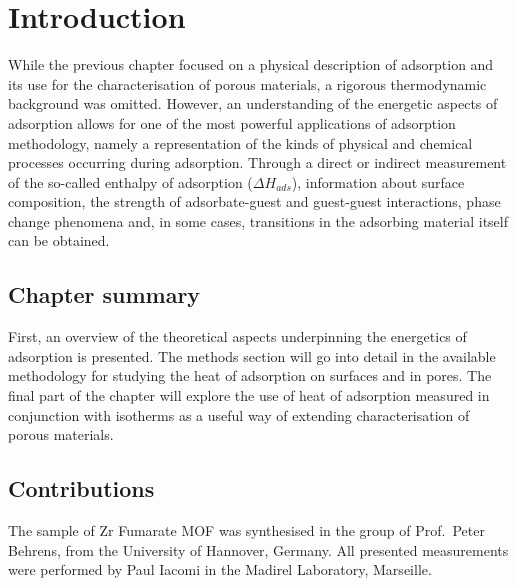 
\section{Introduction}

While the previous chapter focused on a physical description
of adsorption and its use for the characterisation of 
porous materials, a rigorous thermodynamic background
was omitted. However, an understanding of the energetic
aspects of adsorption allows for one of the most powerful
applications of adsorption methodology, namely a representation
of the kinds of physical and chemical processes occurring 
during adsorption. Through a direct or indirect measurement
of the so-called enthalpy of adsorption (\(\Delta H_{ads}\)),
information about surface composition, the strength of 
adsorbate-guest and guest-guest interactions, phase change
phenomena and, in some cases, transitions in the 
adsorbing material itself can be obtained.

\subsection*{Chapter summary}

First, an overview of the theoretical aspects underpinning 
the energetics of adsorption is presented. The methods 
section will go into detail in the available methodology
for studying the heat of adsorption on surfaces and in 
pores. The final part of the chapter will explore the use
of heat of adsorption measured in conjunction with isotherms
as a useful way of extending characterisation of porous
materials.

\subsection*{Contributions}

The sample of Zr Fumarate MOF was synthesised in the group
of Prof.\ Peter Behrens, from the University of Hannover, 
Germany. All presented measurements were performed 
by Paul Iacomi in the Madirel Laboratory, Marseille.
